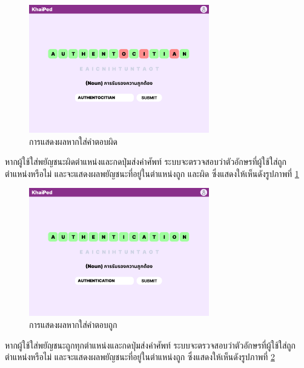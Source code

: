 \documentclass[12pt,oneside,openright,a4paper]{cpe-thai-project}
\begin{document}
\begin{figure}[!h]\centering
	\includegraphics[width=0.7\textwidth, keepaspectratio=true]{image/chap3/ui/game/Word Scramble - Wrong Answer.png}
	\caption{การแสดงผลหากใส่คำตอบผิด}\label{fig:UI_GameWrong}
\end{figure}
\hspace{1cm}
หากผู้ใช้ใส่พยัญชนะผิดตำแหน่งและกดปุ่มส่งคำศัพท์ ระบบจะตรวจสอบว่าตัวอักษรที่ผู้ใช้ใส่ถูกตำแหน่งหรือไม่ และจะแสดงผลพยัญชนะที่อยู่ในตำแหน่งถูก และผิด
ซึ่งแสดงให้เห็นดังรูปภาพที่ \ref{fig:UI_GameWrong}

\pagebreak
\begin{figure}[!h]\centering
	\includegraphics[width=0.7\textwidth, keepaspectratio=true]{image/chap3/ui/game/Word Scramble - Correct Answer.png}
	\caption{การแสดงผลหากใส่คำตอบถูก}\label{fig:UI_GameCorrect}
\end{figure}
\hspace{1cm}
หากผู้ใช้ใส่พยัญชนะถูกทุกตำแหน่งและกดปุ่มส่งคำศัพท์ ระบบจะตรวจสอบว่าตัวอักษรที่ผู้ใช้ใส่ถูกตำแหน่งหรือไม่ และจะแสดงผลพยัญชนะที่อยู่ในตำแหน่งถูก
ซึ่งแสดงให้เห็นดังรูปภาพที่ \ref{fig:UI_GameCorrect}
\end{document}

